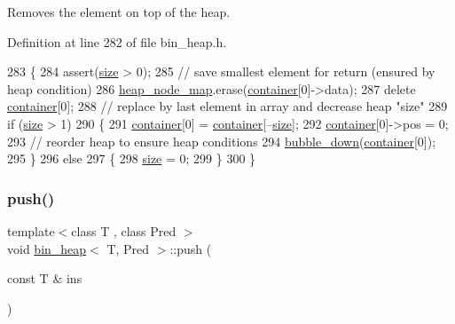 Removes the element on top of the heap. 



Definition at line 282 of file bin\+\_\+heap.\+h.


\begin{DoxyCode}
283 \{
284     assert(\mbox{\hyperlink{classbin__heap_a8dde1008dcc24d734dbdb2c7ca50435b}{size}} > 0);
285     \textcolor{comment}{// save smallest element for return (ensured by heap condition)}
286     \mbox{\hyperlink{classbin__heap_ab646175f97b352ca26587d23bf57c79f}{heap\_node\_map}}.erase(\mbox{\hyperlink{classbin__heap_a413200f4c6e24090c5e9a32184fc8857}{container}}[0]->data);
287     \textcolor{keyword}{delete} \mbox{\hyperlink{classbin__heap_a413200f4c6e24090c5e9a32184fc8857}{container}}[0];
288     \textcolor{comment}{// replace by last element in array and decrease heap "size"}
289     \textcolor{keywordflow}{if} (\mbox{\hyperlink{classbin__heap_a8dde1008dcc24d734dbdb2c7ca50435b}{size}} > 1)
290     \{
291     \mbox{\hyperlink{classbin__heap_a413200f4c6e24090c5e9a32184fc8857}{container}}[0] = \mbox{\hyperlink{classbin__heap_a413200f4c6e24090c5e9a32184fc8857}{container}}[--\mbox{\hyperlink{classbin__heap_a8dde1008dcc24d734dbdb2c7ca50435b}{size}}];
292     \mbox{\hyperlink{classbin__heap_a413200f4c6e24090c5e9a32184fc8857}{container}}[0]->pos = 0;
293     \textcolor{comment}{// reorder heap to ensure heap conditions}
294     \mbox{\hyperlink{classbin__heap_a6c16b71925f4df063778aadc527a6fc6}{bubble\_down}}(\mbox{\hyperlink{classbin__heap_a413200f4c6e24090c5e9a32184fc8857}{container}}[0]);
295     \}
296     \textcolor{keywordflow}{else}
297     \{
298     \mbox{\hyperlink{classbin__heap_a8dde1008dcc24d734dbdb2c7ca50435b}{size}} = 0;
299     \}
300 \}
\end{DoxyCode}
\mbox{\label{classbin__heap_a6d658d61533e66cf83dce2f8e35bed17}} 
\subsubsection{\texorpdfstring{push()}{push()}}
{\footnotesize\ttfamily template$<$class T , class Pred $>$ \\
void \mbox{\hyperlink{classbin__heap}{bin\+\_\+heap}}$<$ T, Pred $>$\+::push (\begin{DoxyParamCaption}\item[{const T \&}]{ins }\end{DoxyParamCaption})}



